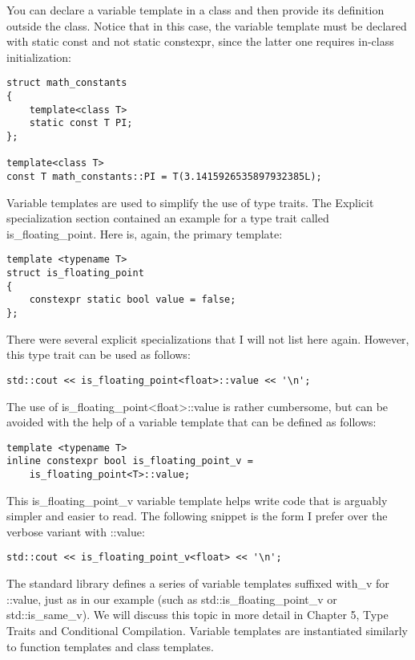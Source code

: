 You can declare a variable template in a class and then provide its definition outside the class. Notice that in this case, the variable template must be declared with static const and not static constexpr, since the latter one requires in-class initialization:

\begin{lstlisting}[style=styleCXX]
struct math_constants
{
	template<class T>
	static const T PI;
};

template<class T>
const T math_constants::PI = T(3.1415926535897932385L);
\end{lstlisting}

Variable templates are used to simplify the use of type traits. The Explicit specialization section contained an example for a type trait called is\_floating\_point. Here is, again, the primary template:

\begin{lstlisting}[style=styleCXX]
template <typename T>
struct is_floating_point
{
	constexpr static bool value = false;
};
\end{lstlisting}

There were several explicit specializations that I will not list here again. However, this type trait can be used as follows:

\begin{lstlisting}[style=styleCXX]
std::cout << is_floating_point<float>::value << '\n';
\end{lstlisting}

The use of is\_floating\_point<float>::value is rather cumbersome, but can be avoided with the help of a variable template that can be defined as follows:

\begin{lstlisting}[style=styleCXX]
template <typename T>
inline constexpr bool is_floating_point_v =
	is_floating_point<T>::value;
\end{lstlisting}

This is\_floating\_point\_v variable template helps write code that is arguably simpler and easier to read. The following snippet is the form I prefer over the verbose variant with ::value:

\begin{lstlisting}[style=styleCXX]
std::cout << is_floating_point_v<float> << '\n';
\end{lstlisting}

The standard library defines a series of variable templates suffixed with\_v for ::value, just as in our example (such as std::is\_floating\_point\_v or std::is\_same\_v). We will discuss this topic in more detail in Chapter 5, Type Traits and Conditional Compilation. Variable templates are instantiated similarly to function templates and class templates.

